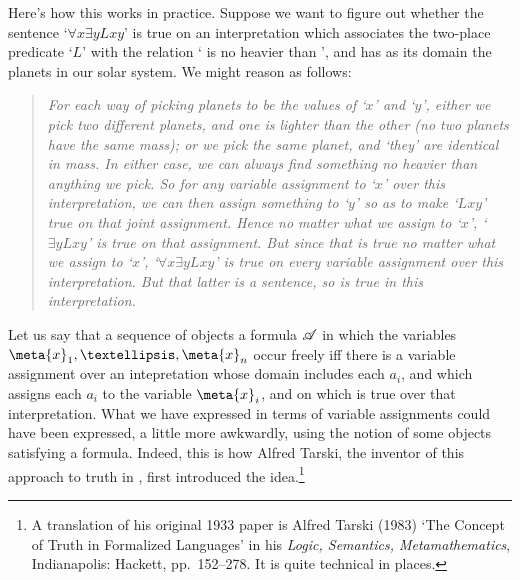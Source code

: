 Here's how this works in practice. Suppose we want to figure out whether the sentence `$\forall x \exists y Lxy$' is true on an interpretation which  associates the two-place predicate `$L$' with the relation ` is no heavier than ', and has as its domain the planets in our solar system. We might reason as follows: \begin{quote}
	\emph{For each way of picking planets to be the values of `$x$' and `$y$', either we pick two different planets, and one is lighter than the other (no two planets have the same mass); or we pick the same planet, and `they' are identical in mass. In either case, we can always find something no heavier than anything we pick. So for any variable assignment to `$x$' over this interpretation,  we can then assign something to `$y$' so as to make `$Lxy$' true on that joint assignment. Hence no matter what we assign to `$x$', `$\exists y Lxy$' is true on that assignment. But since that is true no matter what we assign to `$x$', `$\forall x \exists y Lxy$' is true on every variable assignment over this interpretation. But that latter is a sentence, so is true in this interpretation.}
\end{quote}

Let us say that a sequence of objects   a formula $\mathscr{A}$ in which the variables $\meta{x}_{1},…,\meta{x}_{n}$ occur freely iff there is a variable assignment over an intepretation whose domain includes each $a_{i}$, and which assigns each $a_{i}$ to the variable $\meta{x}_{i}$, and on which  is true over that interpretation. What we have expressed in terms of variable assignments could have been expressed, a little more awkwardly, using the notion of some objects satisfying a formula. Indeed, this is how Alfred Tarski, the inventor of this approach to truth in \FOL, first introduced the idea.\footnote{A translation of his original 1933 paper is Alfred Tarski (1983) `The Concept of Truth in Formalized Languages' in his \emph{Logic, Semantics, Metamathematics}, Indianapolis: Hackett, pp.\ 152–278. It is quite technical in places.}


